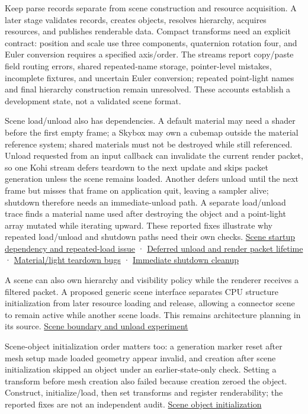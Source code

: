 Keep parse records separate from scene construction and resource acquisition. A later stage validates records, creates objects, resolves hierarchy, acquires resources, and publishes renderable data. Compact transforms need an explicit contract: position and scale use three components, quaternion rotation four, and Euler conversion requires a specified axis/order. The streams report copy/paste field routing errors, shared repeated-name storage, pointer-level mistakes, incomplete fixtures, and uncertain Euler conversion; repeated point-light names and final hierarchy construction remain unresolved. These accounts establish a development state, not a validated scene format.

Scene load/unload also has dependencies. A default material may need a shader before the first empty frame; a Skybox may own a cubemap outside the material reference system; shared materials must not be destroyed while still referenced. Unload requested from an input callback can invalidate the current render packet, so one Kohi stream defers teardown to the next update and skips packet generation unless the scene remains loaded. Another defers unload until the next frame but misses that frame on application quit, leaving a sampler alive; shutdown therefore needs an immediate-unload path. A separate load/unload trace finds a material name used after destroying the object and a point-light array mutated while iterating upward. These reported fixes illustrate why repeated load/unload and shutdown paths need their own checks. \href{https://www.youtube.com/watch?v=N7sc-i-wryw}{Scene startup dependency and repeated-load issue} · \href{https://www.youtube.com/watch?v=FSW72FbVUJk}{Deferred unload and render packet lifetime} · \href{https://www.youtube.com/watch?v=BYZLgM0bZpU}{Material/light teardown bugs} · \href{https://www.youtube.com/watch?v=0ILGxLqvlsA}{Immediate shutdown cleanup}

A scene can also own hierarchy and visibility policy while the renderer receives a filtered packet. A proposed generic scene interface separates CPU structure initialization from later resource loading and release, allowing a connector scene to remain active while another scene loads. This remains architecture planning in its source. \href{https://www.youtube.com/watch?v=BzBkhZ_FAqw}{Scene boundary and unload experiment}

Scene-object initialization order matters too: a generation marker reset after mesh setup made loaded geometry appear invalid, and creation after scene initialization skipped an object under an earlier-state-only check. Setting a transform before mesh creation also failed because creation zeroed the object. Construct, initialize/load, then set transforms and register renderability; the reported fixes are not an independent audit. \href{https://www.youtube.com/watch?v=FSW72FbVUJk}{Scene object initialization}

